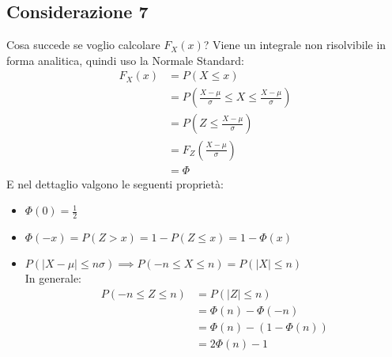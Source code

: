\documentclass[11pt]{report}
\begin{document}
\subsection{Considerazione 7}
Cosa succede se voglio calcolare $F_X(x)$? Viene un integrale non risolvibile in forma analitica, quindi uso la Normale Standard:
\begin{equation}
    \begin{split}
        F_X(x) & = P(X \leq x)\\
        & = P \left( \frac{X-\mu}{\sigma} \leq X \leq \frac{X-\mu}{\sigma} \right)\\
        & = P \left( Z \leq \frac{X-\mu}{\sigma} \right)\\
        & = F_Z \left( \frac{X-\mu}{\sigma} \right)\\
        & = \Phi
    \end{split}
\end{equation}
E nel dettaglio valgono le seguenti proprietà:
\begin{itemize}
	\item $\Phi(0) = \frac{1}{2}$
    \item $\Phi(-x) = P(Z > x) = 1 - P(Z \leq x) = 1 - \Phi(x)$
    \item $P( \mid X - \mu \mid \leq n\sigma ) \implies P(-n \leq X \leq n) = P( \mid X \mid \leq n)$\\
    In generale:
    \begin{equation}
    \begin{split}
        P(-n \leq Z \leq n) & = P( \mid Z \mid \leq n)\\
        & = \Phi(n) - \Phi(-n)\\
        & = \Phi(n) - (1 - \Phi(n))\\
        & = 2\Phi(n) - 1
    \end{split}
\end{equation}
\end{itemize}
\end{document}
